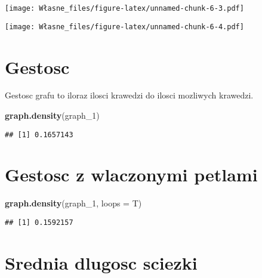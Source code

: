 \documentclass[]{article}
\newenvironment{Shaded}{\begin{snugshade}}{\end{snugshade}}
\newcommand{\KeywordTok}[1]{\textcolor[rgb]{0.13,0.29,0.53}{\textbf{#1}}}
\newcommand{\DataTypeTok}[1]{\textcolor[rgb]{0.13,0.29,0.53}{#1}}
\newcommand{\DecValTok}[1]{\textcolor[rgb]{0.00,0.00,0.81}{#1}}
\newcommand{\StringTok}[1]{\textcolor[rgb]{0.31,0.60,0.02}{#1}}
\newcommand{\OperatorTok}[1]{\textcolor[rgb]{0.81,0.36,0.00}{\textbf{#1}}}
\newcommand{\NormalTok}[1]{#1}
\begin{document}
\texttt{[image: Własne\_files/figure-latex/unnamed-chunk-6-3.pdf]}

\begin{Shaded}
\end{Shaded}

\texttt{[image: Własne\_files/figure-latex/unnamed-chunk-6-4.pdf]}

\section{Gestosc}\label{gestosc}

Gestosc grafu to iloraz ilosci krawedzi do ilosci mozliwych krawedzi.

\begin{Shaded}
\begin{Highlighting}[]
\KeywordTok{graph.density}\NormalTok{(graph_}\DecValTok{1}\NormalTok{)}
\end{Highlighting}
\end{Shaded}

\begin{verbatim}
## [1] 0.1657143
\end{verbatim}

\section{Gestosc z wlaczonymi
petlami}\label{gestosc-z-wlaczonymi-petlami}

\begin{Shaded}
\begin{Highlighting}[]
\KeywordTok{graph.density}\NormalTok{(graph_}\DecValTok{1}\NormalTok{, }\DataTypeTok{loops =}\NormalTok{ T)}
\end{Highlighting}
\end{Shaded}

\begin{verbatim}
## [1] 0.1592157
\end{verbatim}

\section{Srednia dlugosc sciezki}\label{srednia-dlugosc-sciezki}
\end{document}
